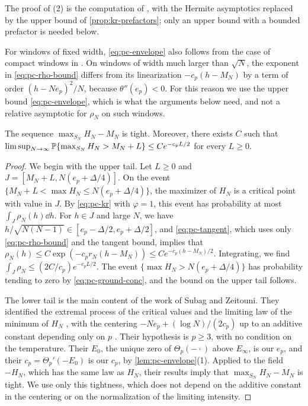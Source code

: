 The proof of (2) is the computation of \cite[Section~4]{SubagZeitouni2017}, with the Hermite asymptotics replaced by the upper bound of \cref{prop:kr-prefactors}; only an upper bound with a bounded prefactor is needed below.

\begin{remark}\label{rem:pc-window}
For windows of fixed width, \eqref{eq:pc-envelope} also follows from the case of compact windows in \cite[Proposition~3]{SubagZeitouni2017}. On windows of width much larger than $\sqrt N$, the exponent in \eqref{eq:pc-rho-bound} differs from its linearization $-c_p(h-M_N)$ by a term of order $(h-Ne_p)^2/N$, because $\theta''(e_p)<0$. For this reason we use the upper bound \eqref{eq:pc-envelope}, which is what the arguments below need, and not a relative asymptotic for $\rho_N$ on such windows.
\end{remark}

\begin{lemma}\label{lem:pc-tight}
The sequence $\max_{S_N}H_N-M_N$ is tight. Moreover, there exists $C$ such that $\limsup_{N\to\infty}\mathbb P\{\max_{S_N}H_N>M_N+L\}\le Ce^{-c_pL/2}$ for every $L\ge0$.
\end{lemma}

\begin{proof}
We begin with the upper tail. Let $L\ge0$ and $J=[M_N+L,N(e_p+\Delta/4)]$. On the event $\{M_N+L<\max H_N\le N(e_p+\Delta/4)\}$, the maximizer of $H_N$ is a critical point with value in $J$. By \eqref{eq:pc-kr} with $\varphi=1$, this event has probability at most $\int_J\rho_N(h)\dd h$. For $h\in J$ and large $N$, we have $h/\sqrt{N(N-1)}\in[e_p-\Delta/2,e_p+\Delta/2]$, and \eqref{eq:pc-tangent}, which uses only \eqref{eq:pc-rho-bound} and the tangent bound, implies that $\rho_N(h)\le C\exp(-c_pr_N(h-M_N))\le Ce^{-c_p(h-M_N)/2}$. Integrating, we find $\int_J\rho_N\le(2C/c_p)e^{-c_pL/2}$. The event $\{\max H_N>N(e_p+\Delta/4)\}$ has probability tending to zero by \eqref{eq:pc-ground-conc}, and the bound on the upper tail follows.

The lower tail is the main content of the work of Subag and Zeitouni. They identified the extremal process of the critical values and the limiting law of the minimum of $H_N$ \cite[Theorem~1 and Corollary~2]{SubagZeitouni2017}, with the centering $-Ne_p+(\log N)/(2c_p)$ up to an additive constant depending only on $p$ \cite[(1.4) and (1.5)]{SubagZeitouni2017}. Their hypothesis is $p\ge3$, with no condition on the temperature. Their $E_0$, the unique zero of $\Theta_p(-\cdot)$ above $E_\infty$, is our $e_p$, and their $c_p=\Theta_p'(-E_0)$ is our $c_p$, by \cref{lem:pc-envelope}(1). Applied to the field $-H_N$, which has the same law as $H_N$, their results imply that $\max_{S_N}H_N-M_N$ is tight. We use only this tightness, which does not depend on the additive constant in the centering or on the normalization of the limiting intensity.
\end{proof}

